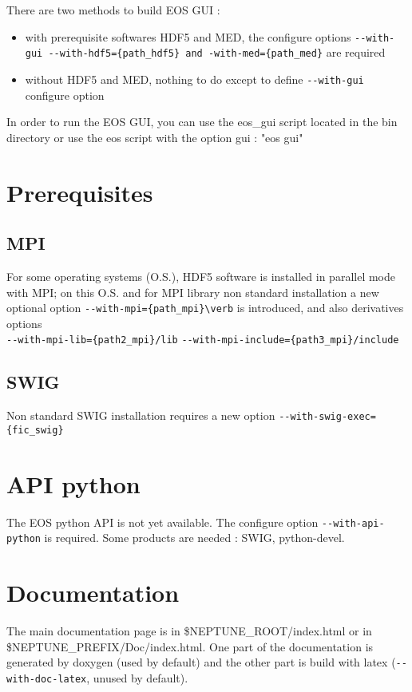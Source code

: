 \documentclass[12pt,a4paper]{article}
\begin{document}
There are two methods to build EOS GUI :
\begin{itemize}
\item with prerequisite softwares HDF5 and MED, the configure options 
  \verb|--with-gui --with-hdf5={path_hdf5} and -with-med={path_med}| are required
\item without HDF5 and MED, nothing to do except to define \verb|--with-gui| configure 
  option
\end{itemize}

In order to run the EOS GUI, you can use the eos\_gui script located in the bin
directory or use the eos script with the option gui : "eos gui"




\section {Prerequisites}



\subsection {MPI}
For some operating systems (O.S.), HDF5 software is installed in parallel mode 
with MPI; on this O.S. and for MPI library non standard installation a new
optional option \verb|--with-mpi={path_mpi}\verb|  is introduced, and also derivatives
options \\ \verb|--with-mpi-lib={path2_mpi}/lib| 
           \verb|--with-mpi-include={path3_mpi}/include|


\subsection {SWIG}
Non standard SWIG installation requires a new option
\verb|--with-swig-exec={fic_swig}|



%
\section{API python}
%

The EOS python API is not yet available.
The configure option \verb|--with-api-python| is required. Some
products are needed : SWIG, python-devel.




%
\section{Documentation}
%
The main documentation page is in \$NEPTUNE\_ROOT/index.html or in \\
\$NEPTUNE\_PREFIX/Doc/index.html.
One part of the documentation is generated by doxygen (used by default)
and the other part is build with latex (\verb|--with-doc-latex|, unused by
default). 
\end{document}
